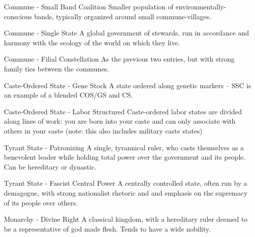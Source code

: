  Commune - Small Band Coalition                        Smaller population of environmentally-
                                                       conscious bands, typically organized around
                                                       small commune-villages.

 Commune - Single State                                A global government of stewards, run in
                                                       accordance and harmony with the ecology of
                                                       the world on which they live.

 Commune - Filial Constellation                        As the previous two entries, but with strong
                                                       family ties between the communes.

 Caste-Ordered State - Gene Stock                      A state ordered along genetic markers -- SSC
                                                       is an example of a blended COS/GS and CS.




 Caste-Ordered State - Labor Structured                Caste-ordered labor states are divided along
                                                       lines of work: you are born into your caste
                                                       and can only associate with others in your
                                                       caste (note: this also includes military caste
                                                       states)

 Tyrant State - Patronizing                            A single, tyrannical ruler, who casts
                                                       themselves as a benevolent leader while
                                                       holding total power over the government and
                                                       its people. Can be hereditary or dynastic.

 Tyrant State - Fascist Central Power                  A centrally controlled state, often run by a
                                                       demagogue, with strong nationalist rhetoric
                                                       and and emphasis on the supremacy of its
                                                       people over others.

 Monarchy - Divine Right                               A classical kingdom, with a hereditary ruler
                                                       deemed to be a representative of god made
                                                       flesh. Tends to have a wide nobility.

